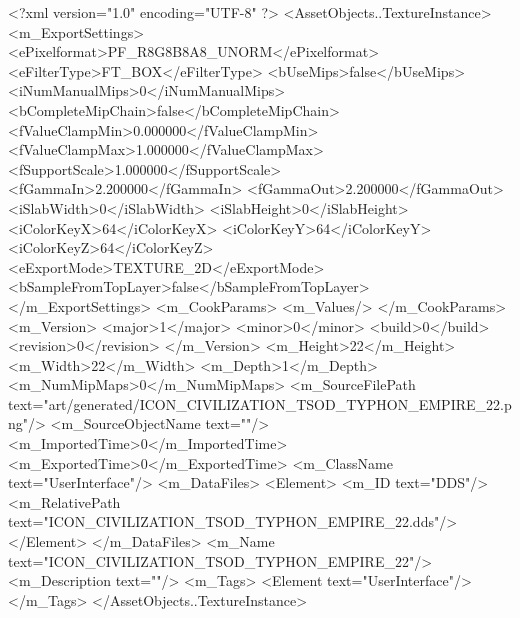 <?xml version="1.0" encoding="UTF-8" ?>
<AssetObjects..TextureInstance>
	<m_ExportSettings>
		<ePixelformat>PF_R8G8B8A8_UNORM</ePixelformat>
		<eFilterType>FT_BOX</eFilterType>
		<bUseMips>false</bUseMips>
		<iNumManualMips>0</iNumManualMips>
		<bCompleteMipChain>false</bCompleteMipChain>
		<fValueClampMin>0.000000</fValueClampMin>
		<fValueClampMax>1.000000</fValueClampMax>
		<fSupportScale>1.000000</fSupportScale>
		<fGammaIn>2.200000</fGammaIn>
		<fGammaOut>2.200000</fGammaOut>
		<iSlabWidth>0</iSlabWidth>
		<iSlabHeight>0</iSlabHeight>
		<iColorKeyX>64</iColorKeyX>
		<iColorKeyY>64</iColorKeyY>
		<iColorKeyZ>64</iColorKeyZ>
		<eExportMode>TEXTURE_2D</eExportMode>
		<bSampleFromTopLayer>false</bSampleFromTopLayer>
	</m_ExportSettings>
	<m_CookParams>
		<m_Values/>
	</m_CookParams>
	<m_Version>
		<major>1</major>
		<minor>0</minor>
		<build>0</build>
		<revision>0</revision>
	</m_Version>
	<m_Height>22</m_Height>
	<m_Width>22</m_Width>
	<m_Depth>1</m_Depth>
	<m_NumMipMaps>0</m_NumMipMaps>
	<m_SourceFilePath text="art/generated/ICON_CIVILIZATION_TSOD_TYPHON_EMPIRE_22.png"/>
	<m_SourceObjectName text=""/>
	<m_ImportedTime>0</m_ImportedTime>
	<m_ExportedTime>0</m_ExportedTime>
	<m_ClassName text="UserInterface"/>
	<m_DataFiles>
		<Element>
			<m_ID text="DDS"/>
			<m_RelativePath text="ICON_CIVILIZATION_TSOD_TYPHON_EMPIRE_22.dds"/>
		</Element>
	</m_DataFiles>
	<m_Name text="ICON_CIVILIZATION_TSOD_TYPHON_EMPIRE_22"/>
	<m_Description text=""/>
	<m_Tags>
		<Element text="UserInterface"/>
	</m_Tags>
</AssetObjects..TextureInstance>
